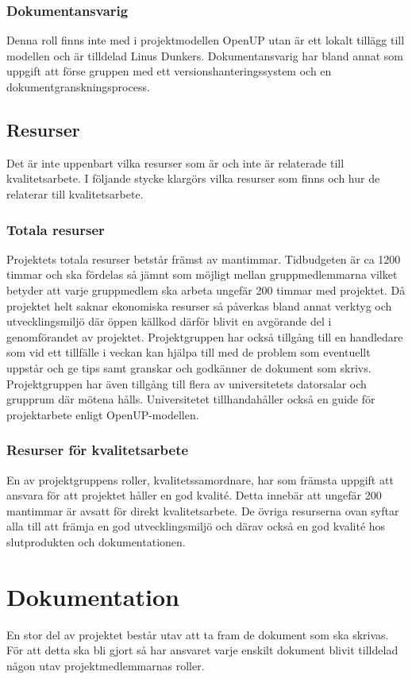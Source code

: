 \subsubsection{Dokumentansvarig}
Denna roll finns inte med i projektmodellen OpenUP utan är ett lokalt tillägg till modellen och är tilldelad Linus Dunkers. Dokumentansvarig har bland annat som uppgift att förse gruppen med ett versionshanteringssystem och en dokumentgranskningsprocess.

\subsection{Resurser}
Det är inte uppenbart vilka resurser som är och inte är relaterade till kvalitetsarbete. I följande stycke klargörs vilka resurser som finns och hur de relaterar till kvalitetsarbete.
\subsubsection{Totala resurser}
Projektets totala resurser betstår främst av mantimmar. Tidbudgeten är ca 1200 timmar och ska fördelas så jämnt som möjligt mellan gruppmedlemmarna vilket betyder att varje gruppmedlem ska arbeta ungefär 200 timmar med projektet. Då projektet helt saknar ekonomiska resurser så påverkas bland annat verktyg och utvecklingsmiljö där öppen källkod därför blivit en avgörande del i genomförandet av projektet. Projektgruppen har också tillgång till en handledare som vid ett tillfälle i veckan kan hjälpa till med de problem som eventuellt uppstår och ge tips samt granskar och godkänner de dokument som skrivs. Projektgruppen har även tillgång till flera av universitetets datorsalar och grupprum där mötena hålls. Universitetet tillhandahåller också en guide för projektarbete enligt OpenUP-modellen.
\subsubsection{Resurser för kvalitetsarbete}
En av projektgruppens roller, kvalitetssamordnare,  har som främsta uppgift att ansvara för att projektet håller en god kvalité. Detta innebär att ungefär 200 mantimmar är avsatt för direkt kvalitetsarbete. De övriga resurserna ovan syftar alla till att främja en god utvecklingsmiljö och därav också en god kvalité hos slutprodukten och dokumentationen.

\section{Dokumentation}
En stor del av projektet består utav att ta fram de dokument som ska skrivas. För att detta ska bli gjort så har ansvaret varje enskilt dokument blivit tilldelad någon utav projektmedlemmarnas roller.
